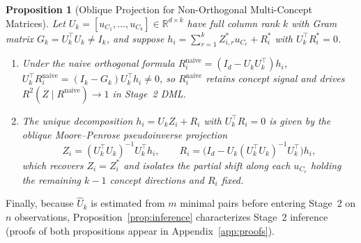 \documentclass[11pt]{article}
\newtheorem{proposition}{Proposition}
\begin{document}
\begin{proposition}[Oblique Projection for Non-Orthogonal Multi-Concept Matrices]\label{prop:oblique}
Let $U_k = [u_{C_1}, \dots, u_{C_k}] \in \mathbb{R}^{d \times k}$ have full column rank $k$ with Gram matrix $G_k = U_k^\top U_k \neq I_k$, and suppose $h_i = \sum_{r=1}^k Z_{i,r}^* u_{C_r} + R_i^*$ with $U_k^\top R_i^* = 0$.
\begin{enumerate}
    \item[(a)] Under the naive orthogonal formula $R_i^{\mathrm{naive}} = (I_d - U_k U_k^\top)h_i$, $U_k^\top R_i^{\mathrm{naive}} = (I_k - G_k)U_k^\top h_i \neq 0$, so $R_i^{\mathrm{naive}}$ retains concept signal and drives $R^2(Z \mid R^{\mathrm{naive}}) \to 1$ in Stage~2 DML.
    \item[(b)] The unique decomposition $h_i = U_k Z_i + R_i$ with $U_k^\top R_i = 0$ is given by the oblique Moore--Penrose pseudoinverse projection
    \begin{equation}\label{eq:oblique}
    Z_i = (U_k^\top U_k)^{-1}U_k^\top h_i, \qquad R_i = \big(I_d - U_k(U_k^\top U_k)^{-1}U_k^\top\big)h_i,
    \end{equation}
    which recovers $Z_i = Z_i^*$ and isolates the partial shift along each $u_{C_r}$ holding the remaining $k-1$ concept directions and $R_i$ fixed.
\end{enumerate}
\end{proposition}

Finally, because $\hat{U}_k$ is estimated from $m$ minimal pairs before entering Stage~2 on $n$ observations, Proposition~\ref{prop:inference} characterizes Stage~2 inference (proofs of both propositions appear in Appendix~\ref{app:proofs}).
\end{document}
